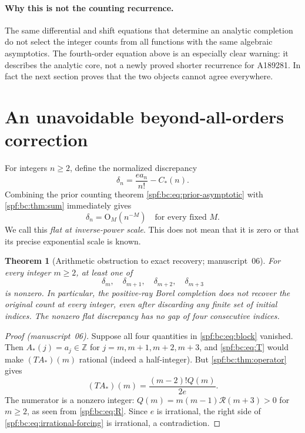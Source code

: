 \documentclass[11pt]{article}
\numberwithin{equation}{section}
\newtheorem{theorem}{Theorem}[section]
\theoremstyle{definition}
\theoremstyle{remark}
\theoremstyle{definition}
\newcommand{\Z}{\mathbb Z}
\newcommand{\bigO}{\mathrm O}
\newcommand{\bcC}{C_{\!*}}
\newcommand{\bcA}{A_{\!*}}
\begin{document}
\paragraph{Why this is not the counting recurrence.}
The same differential and shift equations that determine an analytic
completion do not select the integer counts from all functions with the
same algebraic asymptotics. The fourth-order equation above is an especially
clear warning: it describes the analytic core, not a newly proved shorter
recurrence for A189281. In fact the next section proves that the two objects
cannot agree everywhere.

\section{An unavoidable beyond-all-orders correction}
\label{spf:bc:sec:flat}

For integers $n\ge2$, define the normalized discrepancy
\begin{equation}
 \delta_n=\frac{e a_n}{n!}-\bcC(n).
 \label{spf:bc:eq:delta}
\end{equation}
Combining the prior counting theorem \eqref{spf:bc:eq:prior-asymptotic} with
\cref{spf:bc:thm:sum} immediately gives
\begin{equation}
 \delta_n=\bigO_M(n^{-M})\quad\text{for every fixed }M.
 \label{spf:bc:eq:flat}
\end{equation}
We call this \emph{flat at inverse-power scale}. This does not mean that it
is zero or that its precise exponential scale is known.

\begin{theorem}[Arithmetic obstruction to exact recovery; manuscript~06]
\label{spf:bc:thm:flat-nonzero}
For every integer $m\ge2$, at least one of
\begin{equation}
 \delta_m,\quad\delta_{m+1},\quad\delta_{m+2},\quad\delta_{m+3}
 \label{spf:bc:eq:block}
\end{equation}
is nonzero. In particular, the positive-ray Borel completion does not recover
the original count at every integer, even after discarding any finite set of
initial indices. The nonzero flat discrepancy has no gap of four consecutive
indices.
\end{theorem}
\begin{proof}[Proof (manuscript~06)]
Suppose all four quantities in \eqref{spf:bc:eq:block} vanished. Then
$\bcA(j)=a_j\in\Z$ for $j=m,m+1,m+2,m+3$, and \eqref{spf:bc:eq:T} would make
$(T\bcA)(m)$ rational (indeed a half-integer). But \cref{spf:bc:thm:operator} gives
\begin{equation}
 (T\bcA)(m)=\frac{(m-2)!Q(m)}{2e}.
 \label{spf:bc:eq:irrational-forcing}
\end{equation}
The numerator is a nonzero integer: $Q(m)=m(m-1)\mathcal R(m+3)>0$ for
$m\ge2$, as seen from \eqref{spf:bc:eq:R}. Since $e$ is irrational, the right
side of \eqref{spf:bc:eq:irrational-forcing} is irrational, a contradiction.
\end{proof}
\end{document}
